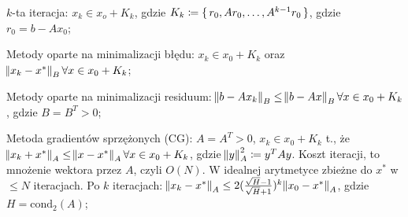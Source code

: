 \entry
$k$-ta iteracja:
$x_k\in x_o+K_k$,
gdzie $K_k\coloneqq \set{r_0, Ar_0,\ldots, A^{k-1}r_0}$,
gdzie $r_0=b-Ax_0$;

\entry
Metody oparte na minimalizacji błędu:
$x_k\in x_0 +K_k$ oraz $\norm{x_k - x^*}_B \forall x\in x_0 + K_k$;

\entry
Metody oparte na minimalizacji residuum:
$\norm{b-Ax_k}_B \leq \norm{b-Ax}_B \forall x\in x_0 +K_k$, gdzie $B=B^T>0$;

\entry
Metoda gradientów sprzężonych (CG):
$A=A^T>0$, $x_k\in x_0 + K_k$ t.,
że $\norm{x_k+x^*}_A\leq \norm{x-x^*}_A \forall x\in x_0 + K_k$,
gdzie $\norm{y}^2_A \coloneqq y^TAy$.
Koszt iteracji, to mnożenie wektora przez $A$, czyli $O(N)$.
W idealnej arytmetyce zbieżne do $x^*$ w $\leq N$ iteracjach.
Po $k$ iteracjach:
$\norm{x_k - x^*}_A\leq 2(\frac{\sqrt{H} - 1}{\sqrt{H} + 1})^k\norm{x_0-x^*}_A$,
gdzie $H=\mathrm{cond}_2(A)$;

